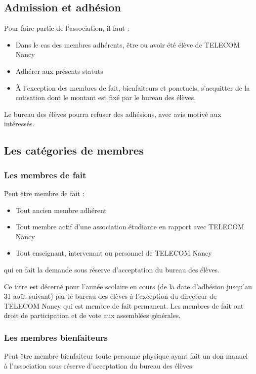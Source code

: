\documentclass{article}
\begin{document}
		\subsection{Admission et adhésion}
			Pour faire partie de l'association, il faut :
			\begin{itemize}
				\item Dans le cas des membres adhérents, être ou avoir été élève
					de TELECOM Nancy
				\item Adhérer aux présents statuts
				\item À l’exception des membres de fait, bienfaiteurs et
					ponctuels, s'acquitter de la cotisation dont le montant est
					fixé par le bureau des élèves.
			\end{itemize}

			Le bureau des élèves pourra refuser des adhésions, avec avis motivé
			aux intéressés.

		\subsection{Les catégories de membres}
			\subsubsection{Les membres de fait}
				Peut être membre de fait :
				\begin{itemize}
					\item Tout ancien membre adhérent
					\item Tout membre actif d’une association étudiante en
						rapport avec TELECOM Nancy
					\item Tout enseignant, intervenant ou personnel de TELECOM
						Nancy
				\end{itemize}
				qui en fait la demande sous réserve d’acceptation du bureau des
				élèves.

				Ce titre est décerné pour l’année scolaire en cours (de la date
				d’adhésion jusqu’au 31 août suivant) par le bureau des élèves à
				l’exception du directeur de TELECOM Nancy qui est membre de fait
				permanent. Les membres de fait ont droit de participation et de
				vote aux assemblées générales.

			\subsubsection{Les membres bienfaiteurs}
				Peut être membre bienfaiteur toute personne physique ayant fait
				un don manuel à l’association sous réserve d’acceptation du
				bureau des élèves.
\end{document}
